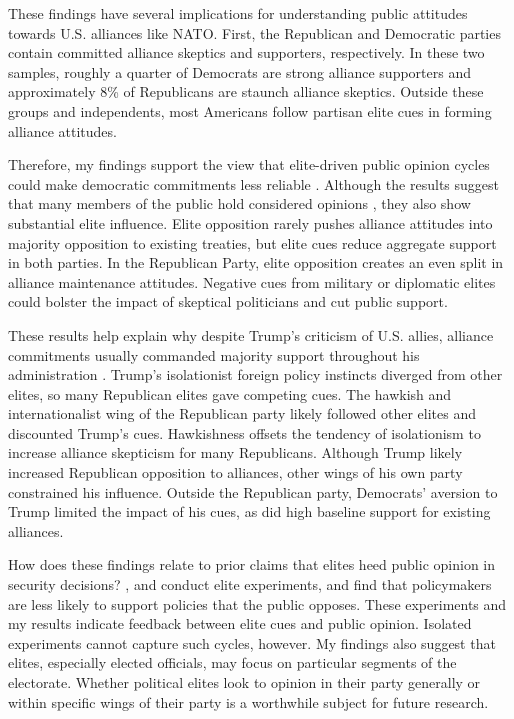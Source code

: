 \documentclass[12pt]{article}
\begin{document}
These findings have several implications for understanding public attitudes towards U.S. alliances like NATO. 
First, the Republican and Democratic parties contain committed alliance skeptics and supporters, respectively.
In these two samples, roughly a quarter of Democrats are strong alliance supporters and approximately 8\% of Republicans are staunch alliance skeptics.
Outside these groups and independents, most Americans follow partisan elite cues in forming alliance attitudes. 


Therefore, my findings support the view that elite-driven public opinion cycles could make democratic commitments less reliable \citep{GartzkeGleditsch2004}. 
Although the results suggest that many members of the public hold considered opinions \citep{PageShapiro1992}, they also show substantial elite influence. 
Elite opposition rarely pushes alliance attitudes into majority opposition to existing treaties, but elite cues reduce aggregate support in both parties.
In the Republican Party, elite opposition creates an even split in alliance maintenance attitudes. 
Negative cues from military or diplomatic elites could bolster the impact of skeptical politicians and cut public support. 


These results help explain why despite Trump's criticism of U.S. allies, alliance commitments usually commanded majority support throughout his administration \citep{PewNATO2020}. 
Trump's isolationist foreign policy instincts diverged from other elites, so many Republican elites gave competing cues.
The hawkish and internationalist wing of the Republican party likely followed other elites and discounted Trump's cues. 
Hawkishness offsets the tendency of isolationism to increase alliance skepticism for many Republicans.
Although Trump likely increased Republican opposition to alliances, other wings of his own party constrained his influence.
Outside the Republican party, Democrats' aversion to Trump limited the impact of his cues, as did high baseline support for existing alliances. 


How does these findings relate to prior claims that elites heed public opinion in security decisions?
\citet{Tomzetal2020}, \citet{LinGreenberg2021} and \citet{ChuRechhia2021} conduct elite experiments, and find that policymakers are less likely to support policies that the public opposes.
These experiments and my results indicate feedback between elite cues and public opinion.
Isolated experiments cannot capture such cycles, however. 
My findings also suggest that elites, especially elected officials, may focus on particular segments of the electorate. 
Whether political elites look to opinion in their party generally or within specific wings of their party is a worthwhile subject for future research.
\end{document}
